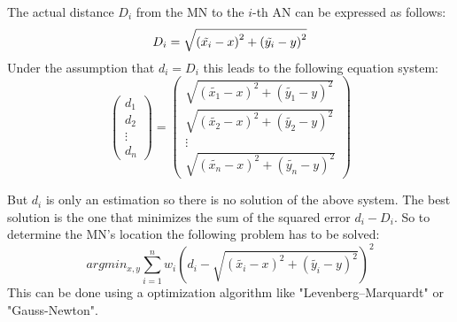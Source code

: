 The actual distance \(D_{i}\) from the MN to the \(i\)-th AN can be expressed as follows:
\begin{equation}
D_{i} = \sqrt{\left ( \tilde{x_{i}}-x \right )^{2}+\left ( \tilde{y_{i}}-y \right )^{2}}
\label{eqn: distance MN to AN_{i}}
\end{equation}
Under the assumption that \(d_{i}=D_{i}\)  this leads to the following equation system:
\begin{equation}
\begin{pmatrix}
d_{1}\\ 
d_{2}\\
\vdots\\
d_{n}
\end{pmatrix}
=
\begin{pmatrix}
\sqrt{\left ( \tilde{x_{1}}-x \right )^{2}+\left ( \tilde{y_{1}}-y \right )^{2}}\\
\sqrt{\left ( \tilde{x_{2}}-x \right )^{2}+\left ( \tilde{y_{2}}-y \right )^{2}} \\
\vdots\\
\sqrt{\left ( \tilde{x_{n}}-x \right )^{2}+\left ( \tilde{y_{n}}-y \right )^{2}}
\end{pmatrix}
\label{eqn: trilateration problem as equation system}
\end{equation}

But \(d_{i}\) is only an estimation so there is no  solution of the above system. The best solution is the one that minimizes the sum of the squared error \(d_{i} - D_{i}\). So to determine the MN's location the following problem has to be solved:
\begin{equation}
argmin_{x,y}\sum_{i=1}^{n}w_{i}\left ( d_{i} - \sqrt{\left ( \tilde{x_{i}}-x \right )^{2}+\left ( \tilde{y_{i}}-y \right )^{2}} \right )^{2}
\label{eqn: trilateration as optimization problem}
\end{equation}
This can be done using a optimization algorithm like "Levenberg–Marquardt" or "Gauss-Newton".


